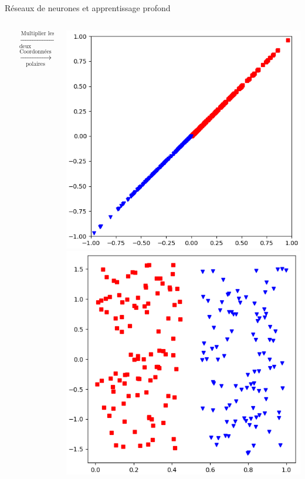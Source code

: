 \documentclass[french]{beamer}
\begin{document}
\begin{frame}{Réseaux de neurones et apprentissage profond}
\begin{columns}[T]
\begin{column}{.3\textwidth}
\begin{center}
\end{center}
\end{column}
\pause
\begin{column}{.3\textwidth}
\vspace{1.5cm}
$$\xrightarrow[\text{deux composantes}]{\text{Multiplier les}}$$
\vspace{2cm}
$$ \xrightarrow[\text{polaires}]{\text{Coordonnées}} $$
\end{column}
\begin{column}{.3\textwidth}
\begin{center}
\includegraphics[width=\linewidth]{figures/xor_transform} \\
\includegraphics[width=\linewidth]{figures/circle_transform} \\

\end{center}
\end{column}
\end{columns}
\end{frame}
\end{document}
